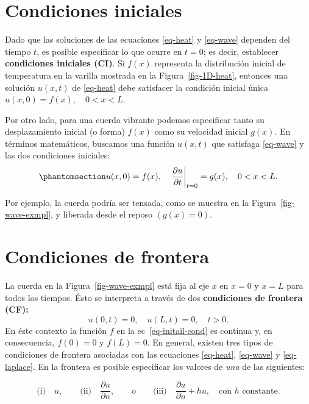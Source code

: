 \documentclass[
  spanish,
  us-letterpaper,
  DIV=11,
  numbers=noendperiod]{scrreprt}
\theoremstyle{plain}
\theoremstyle{definition}
\theoremstyle{remark}
\begin{document}
\section{Condiciones iniciales}\label{condiciones-iniciales}

Dado que las soluciones de las ecuaciones \ref{eq-heat} y \ref{eq-wave}
dependen del tiempo \(t\), es posible especificar lo que ocurre en
\(t = 0\); es decir, establecer \textbf{condiciones iniciales (CI)}. Si
\(f(x)\) representa la distribución inicial de temperatura en la varilla
mostrada en la Figura~\ref{fig-1D-heat}, entonces una solución
\(u(x, t)\) de \ref{eq-heat} debe satisfacer la condición inicial única
\(u(x, 0) = f(x), \quad 0 < x < L\).

Por otro lado, para una cuerda vibrante podemos especificar tanto su
desplazamiento inicial (o forma) \(f(x)\) como su velocidad inicial
\(g(x)\). En términos matemáticos, buscamos una función \(u(x, t)\) que
satisfaga \ref{eq-wave} y las dos condiciones iniciales:
\begin{equation}\phantomsection\label{eq-initail-cond}{
u(x, 0) = f(x), \quad \left. \frac{\partial u}{\partial t} \right|_{t=0} = g(x), \quad 0 < x < L.
}\end{equation}

Por ejemplo, la cuerda podría ser tensada, como se muestra en la
Figura~\ref{fig-wave-exmpl}, y liberada desde el reposo \((g(x)=0)\).

\section{Condiciones de frontera}\label{condiciones-de-frontera}

La cuerda en la Figura~\ref{fig-wave-exmpl} está fija al eje \(x\) en
\(x=0\) y \(x=L\) para todos los tiempos. Ésto se interpreta a través de
dos \textbf{condiciones de frontera (CF):} \[
u(0,t) = 0, \quad u(L,t)=0, \quad t>0.
\] En éste contexto la función \(f\) en la ec~\ref{eq-initail-cond} es
continua y, en consecuencia, \(f(0)=0\) y \(f(L)=0\). En general,
existen tres tipos de condiciones de frontera asociadas con las
ecuaciones \ref{eq-heat}, \ref{eq-wave} y \ref{eq-laplace}. En la
frontera es posible especificar los valores de \emph{una} de las
siguientes:

\[
\text{(i)}\quad u, \qquad \text{(ii)}\quad \dfrac{\partial u}{\partial n},\qquad \text{o}\qquad \text{(iii)}\quad \dfrac{\partial u}{\partial n} + hu,\quad \text{con $h$ constante.}
\]
\end{document}
